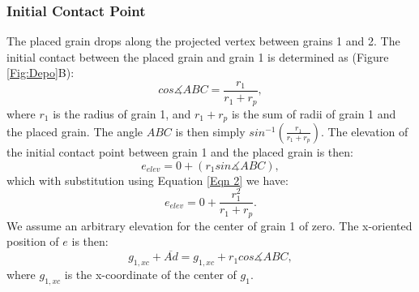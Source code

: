 \documentclass[12pt]{article}
\begin{document}
\subsubsection{Initial Contact Point}
The placed grain drops along the projected vertex between grains 1 and 2. The initial contact between the placed grain and grain 1 is determined as (Figure \ref{Fig:Depo}B):
\begin{equation}
cos \measuredangle ABC = \frac{r_1}{r_1+r_p},
\label{Eqn 2}
\end{equation}
where $r_1$ is the radius of grain 1, and $r_1+r_p$ is the sum of radii of grain 1 and the placed grain. The angle $ABC$ is then simply $sin^{-1}(\frac{r_1}{r_1+r_p})$. The elevation of the initial contact point between grain 1 and the placed grain is then:
\begin{equation}
e_{elev} = 0 + (r_1sin \measuredangle ABC),
\label{Eqn 3}
\end{equation}
which with substitution using Equation \ref{Eqn 2} we have:
\begin{equation}
e_{elev} = 0 + \frac{r_1^2}{r_1+r_p}.
\label{Eqn 4}
\end{equation}
We assume an arbitrary elevation for the center of grain 1 of zero. The x-oriented position of $e$ is then:
\begin{equation}
g_{1,xc}+\overline{Ad} = g_{1,xc}+r_1cos \measuredangle ABC,
\label{Eqn 5}
\end{equation}
where $g_{1,xc}$ is the x-coordinate of the center of $g_1$. 
\end{document}
